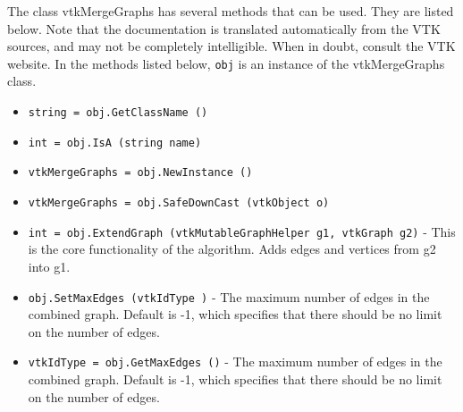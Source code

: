 The class vtkMergeGraphs has several methods that can be used.
  They are listed below.
Note that the documentation is translated automatically from the VTK sources,
and may not be completely intelligible.  When in doubt, consult the VTK website.
In the methods listed below, \verb|obj| is an instance of the vtkMergeGraphs class.
\begin{itemize}
\item  \verb|string = obj.GetClassName ()|

\item  \verb|int = obj.IsA (string name)|

\item  \verb|vtkMergeGraphs = obj.NewInstance ()|

\item  \verb|vtkMergeGraphs = obj.SafeDownCast (vtkObject o)|

\item  \verb|int = obj.ExtendGraph (vtkMutableGraphHelper g1, vtkGraph g2)| -  This is the core functionality of the algorithm. Adds edges
 and vertices from g2 into g1.

\item  \verb|obj.SetMaxEdges (vtkIdType )| -  The maximum number of edges in the combined graph. Default is -1,
 which specifies that there should be no limit on the number
 of edges.

\item  \verb|vtkIdType = obj.GetMaxEdges ()| -  The maximum number of edges in the combined graph. Default is -1,
 which specifies that there should be no limit on the number
 of edges.

\end{itemize}
